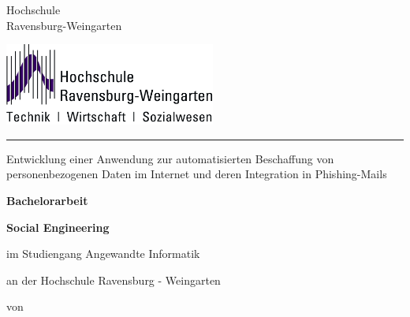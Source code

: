 
\thispagestyle{empty}
{
\normalsize{} \fontsize{12pt}{10}\selectfont 
\vspace{-1cm}
\begin{minipage}[b]{9.4cm}
{\fontsize{13pt}{13} \selectfont%
Hochschule\\[1ex]
Ravensburg-Weingarten}\\[1ex]
\end{minipage}
}
\begin{minipage}[b]{10cm}
\includegraphics*[height=2.7cm]{bilder/HSLogoWGd}
\end{minipage}


\vspace{10mm}
 
\hrule 
\vspace{1cm}
{
 \fontsize{20pt}{20}  \selectfont%
\begin{center}
Entwicklung einer Anwendung zur automatisierten Beschaffung von personenbezogenen Daten im Internet und deren Integration in Phishing-Mails %
\end{center}
}

\begin{center}
\large \textbf{Bachelorarbeit} %
\end{center}

\begin{center}
\textbf{Social Engineering} %
\end{center}

\vspace{5mm}

\begin{center}
im Studiengang Angewandte Informatik %
\end{center}

\begin{center}
an der Hochschule Ravensburg - Weingarten 
\end{center}
\begin{center}

\end{center}
\vspace{5mm}
\begin{center}
von
\end{center}




